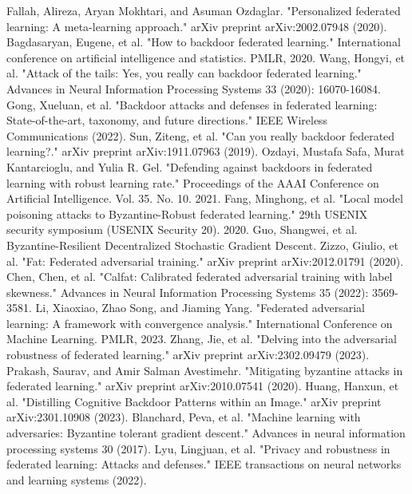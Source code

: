 \documentclass[conference]{IEEEtran}
\begin{document}
\begin{thebibliography}{00}
     Fallah, Alireza, Aryan Mokhtari, and Asuman Ozdaglar. "Personalized federated learning: A meta-learning approach." arXiv preprint arXiv:2002.07948 (2020).
     Bagdasaryan, Eugene, et al. "How to backdoor federated learning." International conference on artificial intelligence and statistics. PMLR, 2020.
     Wang, Hongyi, et al. "Attack of the tails: Yes, you really can backdoor federated learning." Advances in Neural Information Processing Systems 33 (2020): 16070-16084.
     Gong, Xueluan, et al. "Backdoor attacks and defenses in federated learning: State-of-the-art, taxonomy, and future directions." IEEE Wireless Communications (2022).
     Sun, Ziteng, et al. "Can you really backdoor federated learning?." arXiv preprint arXiv:1911.07963 (2019).
     Ozdayi, Mustafa Safa, Murat Kantarcioglu, and Yulia R. Gel. "Defending against backdoors in federated learning with robust learning rate." Proceedings of the AAAI Conference on Artificial Intelligence. Vol. 35. No. 10. 2021.
     Fang, Minghong, et al. "Local model poisoning attacks to {Byzantine-Robust} federated learning." 29th USENIX security symposium (USENIX Security 20). 2020.
     Guo, Shangwei, et al. Byzantine-Resilient Decentralized Stochastic Gradient Descent.
     Zizzo, Giulio, et al. "Fat: Federated adversarial training." arXiv preprint arXiv:2012.01791 (2020).
     Chen, Chen, et al. "Calfat: Calibrated federated adversarial training with label skewness." Advances in Neural Information Processing Systems 35 (2022): 3569-3581.
     Li, Xiaoxiao, Zhao Song, and Jiaming Yang. "Federated adversarial learning: A framework with convergence analysis." International Conference on Machine Learning. PMLR, 2023.
     Zhang, Jie, et al. "Delving into the adversarial robustness of federated learning." arXiv preprint arXiv:2302.09479 (2023).
     Prakash, Saurav, and Amir Salman Avestimehr. "Mitigating byzantine attacks in federated learning." arXiv preprint arXiv:2010.07541 (2020).
     Huang, Hanxun, et al. "Distilling Cognitive Backdoor Patterns within an Image." arXiv preprint arXiv:2301.10908 (2023).
     Blanchard, Peva, et al. "Machine learning with adversaries: Byzantine tolerant gradient descent." Advances in neural information processing systems 30 (2017).
     Lyu, Lingjuan, et al. "Privacy and robustness in federated learning: Attacks and defenses." IEEE transactions on neural networks and learning systems (2022).

\end{thebibliography}
\end{document}
